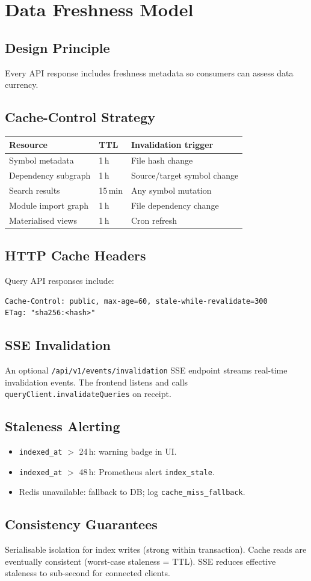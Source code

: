 \chapter{Data Freshness Model}

\section{Design Principle}
Every API response includes freshness metadata so consumers can assess
data currency.

\section{Cache-Control Strategy}

\begin{table}[h]
\centering
\begin{tabular}{@{}lll@{}}
\toprule
\textbf{Resource} & \textbf{TTL} & \textbf{Invalidation trigger} \\
\midrule
Symbol metadata     & 1\,h   & File hash change \\
Dependency subgraph & 1\,h   & Source/target symbol change \\
Search results      & 15\,min & Any symbol mutation \\
Module import graph & 1\,h   & File dependency change \\
Materialised views  & 1\,h   & Cron refresh \\
\bottomrule
\end{tabular}
\end{table}

\section{HTTP Cache Headers}
Query API responses include:
\begin{lstlisting}[language={}]
Cache-Control: public, max-age=60, stale-while-revalidate=300
ETag: "sha256:<hash>"
\end{lstlisting}

\section{SSE Invalidation}
An optional \texttt{/api/v1/events/invalidation} SSE endpoint streams
real-time invalidation events. The frontend listens and calls
\texttt{queryClient.invalidateQueries} on receipt.

\section{Staleness Alerting}
\begin{itemize}
  \item \texttt{indexed\_at} $>$ 24\,h: warning badge in UI.
  \item \texttt{indexed\_at} $>$ 48\,h: Prometheus alert \texttt{index\_stale}.
  \item Redis unavailable: fallback to DB; log \texttt{cache\_miss\_fallback}.
\end{itemize}

\section{Consistency Guarantees}
Serialisable isolation for index writes (strong within transaction).
Cache reads are eventually consistent (worst-case staleness = TTL).
SSE reduces effective staleness to sub-second for connected clients.
